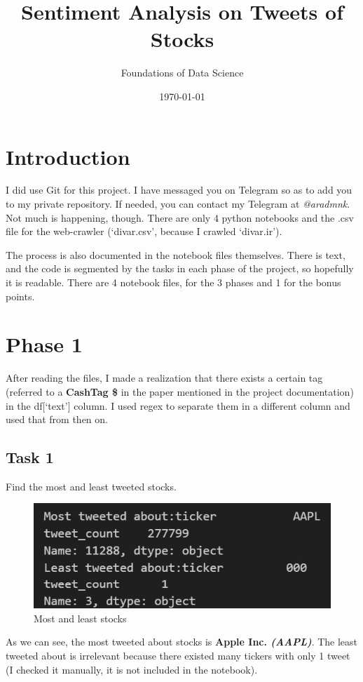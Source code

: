 \documentclass[12pt]{article}
\title{Sentiment Analysis on Tweets of Stocks}
\subtitle{Foundations of Data Science}
\date{\today}
\begin{document}
\maketitlepage
\maketitlestart

\section{Introduction}
I did use Git for this project. I have messaged you on Telegram
so as to add you to my private repository. If needed, you can
contact my Telegram at \textit{@aradmnk}. Not much is happening, though.
There are only 4 python notebooks and the .csv file for the web-crawler
(`divar.csv', because I crawled `divar.ir').

The process is also documented in the notebook files themselves. 
There is text, and the code is segmented by the tasks in each 
phase of the project, so hopefully it is readable.
There are 4 notebook files, for the 3 phases and 1
for the bonus points.


\pagebreak

\section{Phase 1}
After reading the files, I made a realization that there exists a
certain tag (referred to a \textbf{CashTag \$} in the paper mentioned
in the project documentation) in the df[`text'] column. I used regex
to separate them in a different column and used that from then on.

\subsection{Task 1}

\begin{qsolve}[Task]
    Find the most and least tweeted stocks.
\end{qsolve}

\begin{figure}[h!]
    \centering
    \includegraphics[width=.7\textwidth]{P1.1.jpg}
    \caption{Most and least stocks}
    \label{fig:1.1}
\end{figure}

As we can see, the most tweeted about stocks is \textbf{Apple Inc. \textit{(AAPL)}}.
The least tweeted about is irrelevant because there existed many tickers with
only 1 tweet (I checked it manually, it is not included in the notebook).
\end{document}
